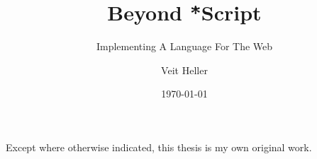 \documentclass[oneside,11pt,xetex]{scrbook}
\begin{document}

\renewcommand{\thepage}{\roman{page}}

\pagestyle{empty}

\title{Beyond \.*Script}
\subtitle{Implementing A Language For The Web}

\author{Veit Heller}

\date{\today}

\publishers{%
  \normalsize{%
  A thesis submitted for the degree of \\
  B.Sc. of Applied Computer Science of \\
  The University of Applied Sciences Berlin}}

\uppertitleback{%
  \textbf{Institutional Address}\\
  HTW Berlin\\
  Campus Treskowallee\\
  Treskowallee 8\\
  10318 Berlin\\
  \textsc{Germany}\\
  \bigskip\\
  \textbf{Supervisory Panel}\\

  Prof. Hendrik Gärtner\\
  HTW Berlin\\

  Prof. Henrick Lochmann\\
  HTW Berlin\\
  \bigskip\\
  Set with the help of {\KOMAScript} and
  \XeLaTeX.\\

  \copyright~\the\year. All rights reserved.}

\dedication{\small{\emph{For Meredith, Tobias and all the people who cope with me. Your undying support will not be forgotten.}}}

\maketitle

\frontmatter

\vspace*{0.4\textheight}

\begin{center}
  Except where otherwise indicated, this thesis is my own original
  work.
\end{center}
\vspace*{4cm}
\end{document}
